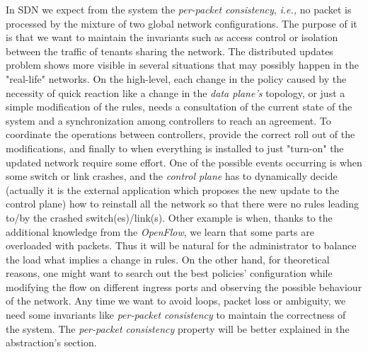 \documentclass{article}
\theoremstyle{remark}
\begin{document}
In SDN we expect from the system the \emph{per-packet consistency}, \emph{i.e.,} no packet is processed by the mixture of two global network configurations. 
The purpose of it is that we want to maintain the invariants such as access control or isolation between the traffic of tenants sharing the network\cite{Casado:2014:ASN:2661061.2661063}.
The distributed updates problem shows more visible in several situations that may possibly happen in the "real-life" networks.
On the high-level, each change in the policy caused by the necessity of quick reaction like a change in the \emph{data plane's} topology, or just a simple modification of the rules, needs a consultation of the current state of the system and a synchronization among controllers to reach an agreement. To coordinate the operations between controllers, provide the correct roll out of the modifications, and finally to when everything is installed to just "turn-on" the updated network require some effort.
One of the possible events occurring is when some switch or link crashes, and the \emph{control plane} has to dynamically decide (actually it is the external application which proposes the new update to the control plane) how to reinstall all the network so that there were no rules leading to/by the crashed switch(es)/link(s). 
Other example is when, thanks to the additional knowledge from the \emph{OpenFlow}, we learn that some parts are overloaded with packets. Thus it will be natural for the administrator to balance the load what implies a change in rules.
On the other hand, for theoretical reasons, one might want to search out the best policies' configuration while modifying the flow on different ingress ports and observing the possible behaviour of the network.
Any time we want to avoid loops, packet loss or ambiguity, we need some invariants like \emph{per-packet consistency} to maintain the correctness of the system.
The \emph{per-packet consistency} property will be better explained in the abstraction's section.


% 
%
\end{document}
